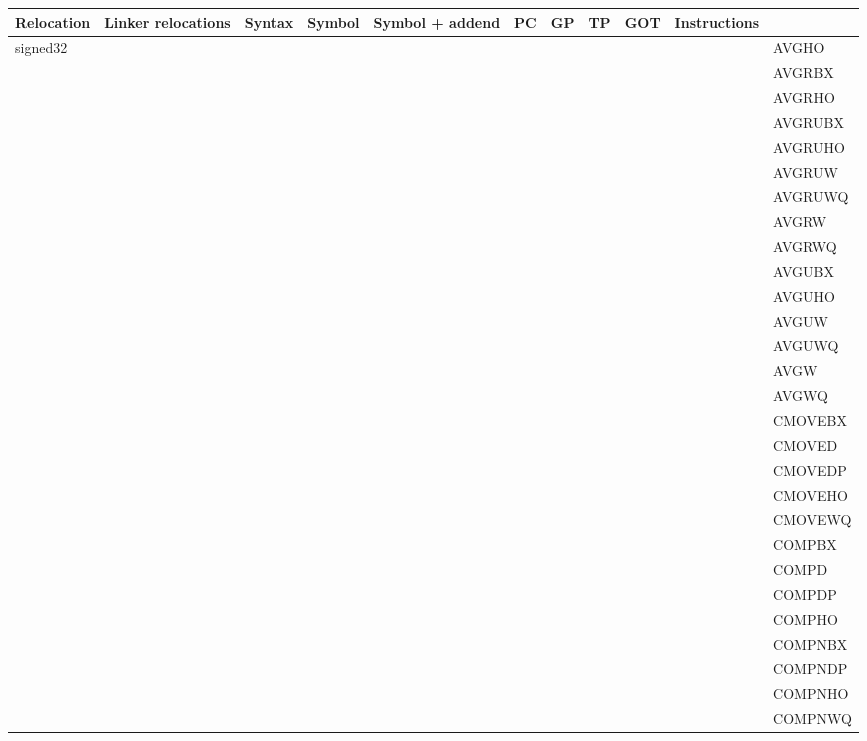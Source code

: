 {\tiny
\begin{tabular}{|l|l|l|l|l|l|l|l|l|l|l|} \hline
\textsf{Relocation} & \textsf{Linker relocations} & \textsf{Syntax} & \textsf{Symbol} & \textsf{Symbol + addend} & \textsf{PC} & \textsf{GP} & \textsf{TP} & \textsf{GOT} & \textsf{Instructions} \\
\hline
\textsf{signed32} & & & & & & & & & & \textsf{AVGHO} \\
 & & & & & & & & & & \textsf{AVGRBX} \\
 & & & & & & & & & & \textsf{AVGRHO} \\
 & & & & & & & & & & \textsf{AVGRUBX} \\
 & & & & & & & & & & \textsf{AVGRUHO} \\
 & & & & & & & & & & \textsf{AVGRUW} \\
 & & & & & & & & & & \textsf{AVGRUWQ} \\
 & & & & & & & & & & \textsf{AVGRW} \\
 & & & & & & & & & & \textsf{AVGRWQ} \\
 & & & & & & & & & & \textsf{AVGUBX} \\
 & & & & & & & & & & \textsf{AVGUHO} \\
 & & & & & & & & & & \textsf{AVGUW} \\
 & & & & & & & & & & \textsf{AVGUWQ} \\
 & & & & & & & & & & \textsf{AVGW} \\
 & & & & & & & & & & \textsf{AVGWQ} \\
 & & & & & & & & & & \textsf{CMOVEBX} \\
 & & & & & & & & & & \textsf{CMOVED} \\
 & & & & & & & & & & \textsf{CMOVEDP} \\
 & & & & & & & & & & \textsf{CMOVEHO} \\
 & & & & & & & & & & \textsf{CMOVEWQ} \\
 & & & & & & & & & & \textsf{COMPBX} \\
 & & & & & & & & & & \textsf{COMPD} \\
 & & & & & & & & & & \textsf{COMPDP} \\
 & & & & & & & & & & \textsf{COMPHO} \\
 & & & & & & & & & & \textsf{COMPNBX} \\
 & & & & & & & & & & \textsf{COMPNDP} \\
 & & & & & & & & & & \textsf{COMPNHO} \\
 & & & & & & & & & & \textsf{COMPNWQ} \\

\end{tabular}}
